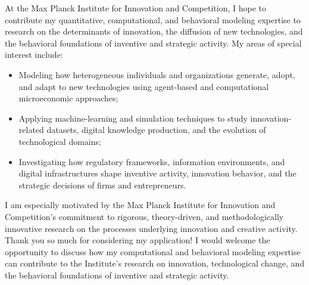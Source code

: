 \documentclass{nfr}
\begin{document}
At the Max Planck Institute for Innovation and Competition, I hope to contribute my quantitative, computational, and behavioral modeling expertise to research on the determinants of innovation, the diffusion of new technologies, and the behavioral foundations of inventive and strategic activity. 
My areas of special interest include:
\begin{itemize}
    \item Modeling how heterogeneous individuals and organizations generate, adopt, and adapt to new technologies using agent-based and computational microeconomic approaches;
    \item Applying machine-learning and simulation techniques to study innovation-related datasets, digital knowledge production, and the evolution of technological domains;
    \item Investigating how regulatory frameworks, information environments, and digital infrastructures shape inventive activity, innovation behavior, and the strategic decisions of firms and entrepreneurs.
\end{itemize}

I am especially motivated by the Max Planck Institute for Innovation and Competition’s commitment to rigorous, theory-driven, and methodologically innovative research on the processes underlying innovation and creative activity. 
\\

Thank you so much for considering my application! I would welcome the opportunity to discuss how my computational and behavioral modeling expertise can contribute to the Institute’s research on innovation, technological change, and the behavioral foundations of inventive and strategic activity.
\vspace{5mm}
\end{document}
